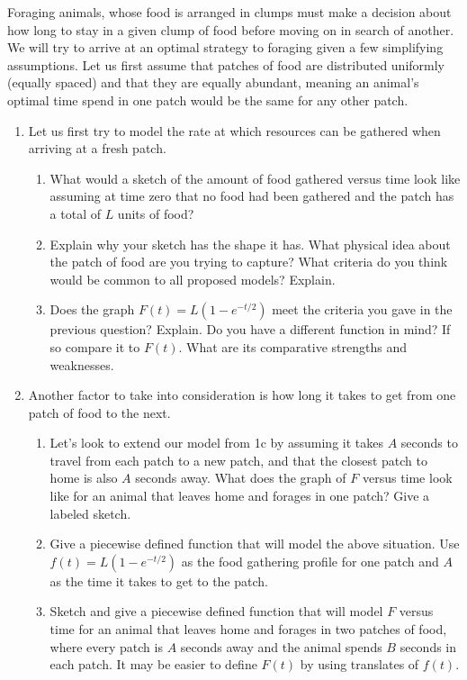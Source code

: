 \documentclass{amsbook}
\begin{document}
Foraging animals, whose food is arranged in clumps must make a decision about how long to stay in a given clump of food before moving on in search of another. We will try to arrive at an optimal strategy to foraging given a few simplifying assumptions. Let us first assume that patches of food are distributed uniformly (equally spaced) and that they are equally abundant, meaning an animal's optimal time spend in one patch would be the same for any other patch.
\begin{enumerate}
	
	\item Let us first try to model the rate at which resources can be gathered when arriving at a fresh patch.
		\begin{enumerate}
			\item What would a sketch of the amount of food gathered versus time look like assuming at time zero that no food had been gathered and the patch has a total of $L$ units of food?
			\item Explain why your sketch has the shape it has. What physical idea about the patch of food are you trying to capture? What criteria do you think would be common to all proposed models? Explain.
			\item Does the graph $F(t)=L(1-e^{-t/2})$ meet the criteria you gave in the previous question? Explain. Do you have a different function in mind? If so compare it to $F(t)$. What are its comparative strengths and weaknesses.
		\end{enumerate}
		\item Another factor to take into consideration is how long it takes to get from one patch of food to the next.
		\begin{enumerate}
			\item Let's look to extend our model from 1c by assuming it takes $A$ seconds to travel from each patch to a new patch, and that the closest patch to home is also $A$ seconds away. What does the graph of $F$ versus time look like for an animal that leaves home and forages in one patch? Give a labeled sketch.
			\item Give a piecewise defined function that will model the above situation. Use $f(t)=L(1-e^{-t/2})$ as the food gathering profile for one patch and $A$ as the time it takes to get to the patch.
			\item Sketch and give a piecewise defined function that will model $F$ versus time for an animal that leaves home and forages in two patches of food, where every patch is $A$ seconds away and the animal spends $B$ seconds in each patch. It may be easier to define $F(t)$ by using translates of $f(t)$.

\end{enumerate}
\end{enumerate}
\end{document}
